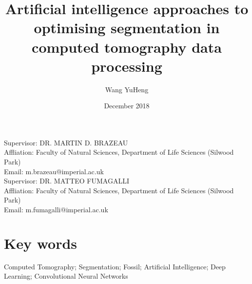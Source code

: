 \documentclass[11pt,a4paper]{article}
\title{\myfont Artificial intelligence approaches to optimising segmentation in computed tomography data processing}
\author{Wang YuHeng }
\date{December 2018}
\begin{document}
\maketitle
\begin{center}
\vspace{4.8cm}
Supervisor: DR. MARTIN D. BRAZEAU 
\\
Affliation: Faculty of Natural Sciences, Department of Life Sciences (Silwood Park)
\\
Email: m.brazeau@imperial.ac.uk
\\
\vspace{1.5cm}
Supervisor: DR. MATTEO FUMAGALLI 
\\
Affliation: Faculty of Natural Sciences, Department of Life Sciences (Silwood Park)
\\
Email: m.fumagalli@imperial.ac.uk
\end{center}
\newpage


\section{Key words}
Computed Tomography; Segmentation; Fossil; Artificial Intelligence; Deep Learning; Convolutional Neural Networks
\end{document}
